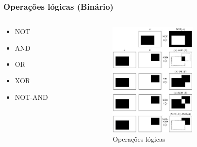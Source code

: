 \documentclass[aspectratio=169]{beamer}
\theoremstyle{Definition}
\begin{document}
\begin{frame}
	\frametitle{Operações lógicas (Binário) }
	
	\begin{columns}
		\begin{column}{0.3\textwidth}
		   \begin{itemize}
				\item NOT
				\item AND
				\item OR
				\item XOR
				\item NOT-AND
			\end{itemize}
		\end{column}
		\begin{column}{0.7\textwidth}  %
    		\begin{figure}[h]
	   	 		\includegraphics[width=4.4cm]{imagens/logical}
			    \caption{Operações lógicas}\label{figLogical}
	  		\end{figure}
		\end{column}
	\end{columns}
\end{frame}
\end{document}
